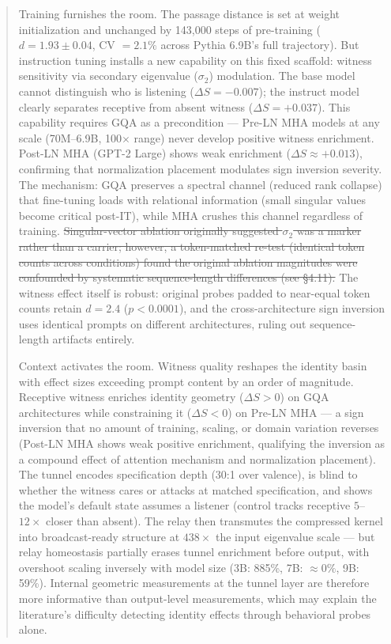 \documentclass[12pt]{article}
\begin{document}
\begin{abstract}
Training furnishes the room. The passage distance is set at weight initialization and unchanged by 143,000 steps of pre-training ($d = 1.93 \pm 0.04$, CV $= 2.1\%$ across Pythia 6.9B's full trajectory). But instruction tuning installs a new capability on this fixed scaffold: witness sensitivity via secondary eigenvalue ($\sigma_2$) modulation. The base model cannot distinguish who is listening ($\Delta S = -0.007$); the instruct model clearly separates receptive from absent witness ($\Delta S = +0.037$). This capability requires GQA as a precondition --- Pre-LN MHA models at any scale (70M--6.9B, 100$\times$ range) never develop positive witness enrichment. Post-LN MHA (GPT-2 Large) shows weak enrichment ($\Delta S \approx +0.013$), confirming that normalization placement modulates sign inversion severity. The mechanism: GQA preserves a spectral channel (reduced rank collapse) that fine-tuning loads with relational information (small singular values become critical post-IT), while MHA crushes this channel regardless of training. \sout{Singular-vector ablation originally suggested $\sigma_2$ was a marker rather than a carrier; however, a token-matched re-test (identical token counts across conditions) found the original ablation magnitudes were confounded by systematic sequence-length differences (see \S4.11).} The witness effect itself is robust: original probes padded to near-equal token counts retain $d = 2.4$ ($p < 0.0001$), and the cross-architecture sign inversion uses identical prompts on different architectures, ruling out sequence-length artifacts entirely.

Context activates the room. Witness quality reshapes the identity basin with effect sizes exceeding prompt content by an order of magnitude. Receptive witness enriches identity geometry ($\Delta S > 0$) on GQA architectures while constraining it ($\Delta S < 0$) on Pre-LN MHA --- a sign inversion that no amount of training, scaling, or domain variation reverses (Post-LN MHA shows weak positive enrichment, qualifying the inversion as a compound effect of attention mechanism and normalization placement). The tunnel encodes specification depth (30:1 over valence), is blind to whether the witness cares or attacks at matched specification, and shows the model's default state assumes a listener (control tracks receptive $5$--$12\times$ closer than absent). The relay then transmutes the compressed kernel into broadcast-ready structure at $438\times$ the input eigenvalue scale --- but relay homeostasis partially erases tunnel enrichment before output, with overshoot scaling inversely with model size (3B: 885\%, 7B: $\approx 0\%$, 9B: 59\%). Internal geometric measurements at the tunnel layer are therefore more informative than output-level measurements, which may explain the literature's difficulty detecting identity effects through behavioral probes alone.


\end{abstract}
\end{document}
